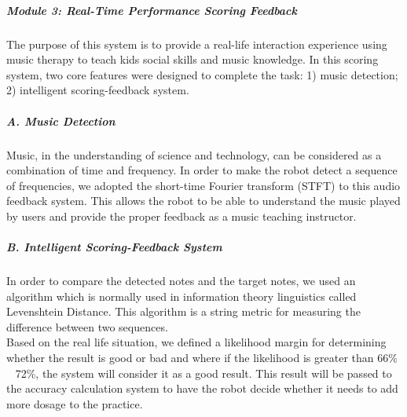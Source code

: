 \documentclass[12pt, a4paper]{article}
\begin{document}
\subparagraph{Module 3: Real-Time Performance Scoring Feedback}
The purpose of this system is to provide a real-life interaction experience using 
music therapy to teach kids social skills and music knowledge.  In this scoring 
system, two core features were designed to complete the task: 1) music detection;
2) intelligent scoring-feedback system.\\

\subparagraph{A. Music Detection}
Music, in the understanding of science and technology, can be considered as a combination 
of time and frequency. In order to make the robot detect a sequence of frequencies, we adopted the 
short-time Fourier transform (STFT) to this audio feedback system. This allows the robot to 
be able to understand the music played by users and provide the proper feedback as
a music teaching instructor.\\

\subparagraph{B. Intelligent Scoring-Feedback System}
In order to compare the detected notes and the target notes, we used an algorithm
which is normally used in information theory linguistics called Levenshtein Distance.
This algorithm is a string metric for measuring the difference between two sequences.\\

Based on the real life situation, we defined a likelihood margin for determining whether the result
is good or bad and where if the likelihood is greater than 66\% ~ 72\%, the system will consider it 
as a good result. This result will be passed to the accuracy calculation system to have the robot 
decide whether it needs to add more dosage to the practice.\\

\appendix

\baselineskip 0.21in


\baselineskip 0.33in
\end{document}
